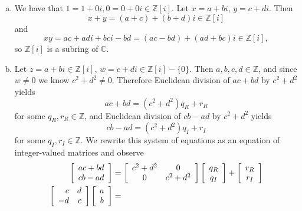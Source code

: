 \documentclass{article}
\begin{document}
\begin{Answer}
  \begin{enumerate}[(a)]
    \item{
      We have that $1 = 1 + 0i, 0 = 0 + 0i \in \mathbb{Z}[i]$.
      Let $x = a + bi$, $y = c + di$. Then
      $$
      x + y = (a + c) + (b + d)i \in \mathbb{Z}[i]
      $$
      and
      $$
      xy = ac + adi + bci - bd = (ac - bd) + (ad + bc)i
        \in \mathbb{Z}[i],
      $$
      so $\mathbb{Z}[i]$ is a subring of $\mathbb{C}$.
    }
    \item{
      Let $z = a + bi \in \mathbb{Z}[i]$,
      $w = c + di \in \mathbb{Z}[i] - \{0\}$. Then
      $a, b, c, d \in \mathbb{Z}$, and since $w \neq 0$ we know
      $c^2 + d^2 \neq 0$. Therefore Euclidean
      division of $ac + bd$ by $c^2 + d^2$ yields
      $$
      ac + bd = (c^2 + d^2) q_R + r_R
      $$
      for some $q_R, r_R \in \mathbb{Z}$, and Euclidean division of
      $cb - ad$ by $c^2 + d^2$ yields
      $$
      cb - ad = (c^2 + d^2) q_I + r_I
      $$
      for some $q_I, r_I \in \mathbb{Z}$. We rewrite this system of
      equations as an equation of integer-valued matrices and observe
      \begin{align*}
        \left[\begin{array}{c}
          ac + bd \\
          cb - ad
        \end{array}\right]
        &=
        \left[\begin{array}{c c}
          c^2 + d^2 & 0 \\
          0         & c^2 + d^2
        \end{array}\right]
        \left[\begin{array}{c}
          q_R \\
          q_I
        \end{array}\right]
        +
        \left[\begin{array}{c}
          r_R \\
          r_I
        \end{array}\right] \\
        \left[\begin{array}{r r}
          c & d \\
         -d & c
        \end{array}\right]
        \left[\begin{array}{c}
          a \\
          b
        \end{array}\right]
        &=

\end{align*}}
\end{enumerate}
\end{Answer}
\end{document}
